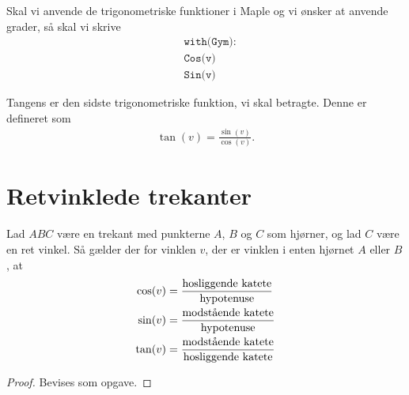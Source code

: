 \documentclass[12pt]{article}
\begin{document}
Skal vi anvende de trigonometriske funktioner i Maple og vi ønsker at anvende grader, så skal vi skrive
\begin{align*}
	&\texttt{with(Gym):} \\
	&\texttt{Cos(v)} \\	
	&\texttt{Sin(v)}
\end{align*}



Tangens er den sidste trigonometriske funktion, vi skal betragte. Denne er defineret som 
\begin{align*}
\tan(v) = \frac{\sin(v)}{\cos(v)}.
\end{align*}


\section*{Retvinklede trekanter}

\begin{setn}
	\label{setn:trigretvinkel}
Lad $ABC$ være en trekant med punkterne $A$,  $B$ og $C$ som hjørner, og lad $C$ være en ret vinkel. Så gælder der for vinklen $v$, der er vinklen i enten hjørnet $A$ eller $B$, at 
\begin{align*}
\cos(v) &= \frac{\textnormal{hosliggende katete}}{\textnormal{hypotenuse}}\\
\sin(v) &= \frac{\textnormal{modstående katete}}{\textnormal{hypotenuse}}\\
\tan(v) &= \frac{\textnormal{modstående katete}}{\textnormal{hosliggende katete}}
\end{align*}
\end{setn}
\begin{proof}
Bevises som opgave.
\end{proof}
\end{document}
